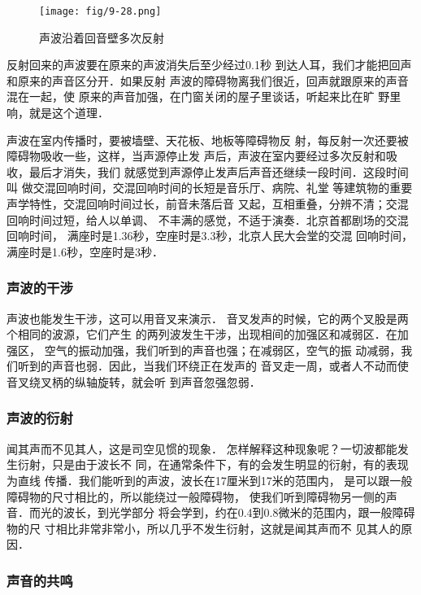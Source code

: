 \begin{figure}[htp]
    \centering
    \texttt{[image: fig/9-28.png]}
    \caption{声波沿着回音壁多次反射}
\end{figure}

反射回来的声波要在原来的声波消失后至少经过0.1秒
到达人耳，我们才能把回声和原来的声音区分开．如果反射
声波的障碍物离我们很近，回声就跟原来的声音混在一起，使
原来的声音加强，在门窗关闭的屋子里谈话，听起来比在旷
野里响，就是这个道理．

声波在室内传播时，要被墙壁、天花板、地板等障碍物反
射，每反射一次还要被障碍物吸收一些，这样，当声源停止发
声后，声波在室内要经过多次反射和吸收，最后才消失，我们
就感觉到声源停止发声后声音还继续一段时间．这段时间叫
做交混回响时间，交混回响时间的长短是音乐厅、病院、礼堂
等建筑物的重要声学特性，交混回响时间过长，前音未落后音
又起，互相重叠，分辨不清；交混回响时间过短，给人以单调、
不丰满的感觉，不适于演奏．北京首都剧场的交混回响时间，
满座时是1.36秒，空座时是3.3秒，北京人民大会堂的交混
回响时间，满座时是1.6秒，空座时是3秒．

\subsubsection{声波的干涉}

声波也能发生干涉，这可以用音叉来演示．
音叉发声的时候，它的两个叉股是两个相同的波源，它们产生
的两列波发生干涉，出现相间的加强区和减弱区．在加强区，
空气的振动加强，我们听到的声音也强；在减弱区，空气的振
动减弱，我们听到的声音也弱．因此，当我们环绕正在发声的
音叉走一周，或者人不动而使音叉绕叉柄的纵轴旋转，就会听
到声音忽强忽弱．

\subsubsection{声波的衍射}

闻其声而不见其人，这是司空见惯的现象．
怎样解释这种现象呢？一切波都能发生衍射，只是由于波长不
同，在通常条件下，有的会发生明显的衍射，有的表现为直线
传播．我们能听到的声波，波长在17厘米到17米的范围内，
是可以跟一般障碍物的尺寸相比的，所以能绕过一般障碍物，
使我们听到障碍物另一侧的声音．而光的波长，到光学部分
将会学到，约在0.4到0.8微米的范围内，跟一般障碍物的尺
寸相比非常非常小，所以几乎不发生衍射，这就是闻其声而不
见其人的原因．


\subsubsection{声音的共鸣}


